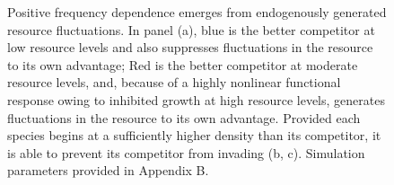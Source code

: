 \newpage
\begin{figure}[h!]
	\centering
	\caption[Positive frequency dependence emergeing from endogenously generated resource fluctuations.]{\hspace{1mm}Positive frequency dependence emerges from endogenously generated resource fluctuations. In panel (a), blue is the better competitor at low resource levels and also suppresses fluctuations in the resource to its own advantage; Red is the better competitor at moderate resource levels, and, because of a highly nonlinear functional response owing to inhibited growth at high resource levels, generates fluctuations in the resource to its own advantage. Provided each species begins at a sufficiently higher density than its competitor, it is able to prevent its competitor from invading (b, c). Simulation parameters provided in Appendix B.}
	\label{fig:Fig2}
\end{figure}



